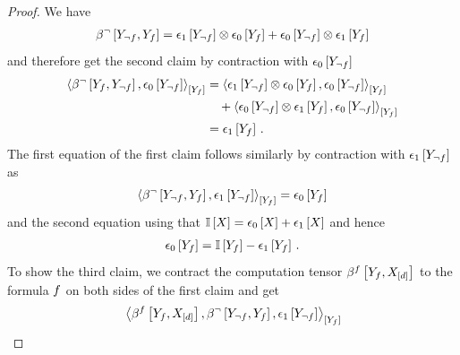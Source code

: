 \begin{proof}
    We have
    \begin{align*}
        \bencodingofat{\lnot}{\headvariableof{\lnot\exformula},\formulavar}
        = \tbasisat{\headvariableof{\lnot\exformula}} \otimes \fbasisat{\formulavar}
        +\fbasisat{\headvariableof{\lnot\exformula}} \otimes \tbasisat{\formulavar}
    \end{align*}
    and therefore get the second claim by contraction with $\epsilon_{0}\left[Y_{\lnot f}\right]$
    \begin{align*}
        \contractionof{
            \bencodingofat{\lnot}{\formulavar,\headvariableof{\lnot\exformula}},\fbasisat{\headvariableof{\lnot\exformula}}
        }{\formulavar}
        &=  \contractionof{
            \tbasisat{\headvariableof{\lnot\exformula}} \otimes \fbasisat{\formulavar},\fbasisat{\headvariableof{\lnot\exformula}}
        }{\formulavar} \\
        &\quad +  \contractionof{
            \fbasisat{\headvariableof{\lnot\exformula}} \otimes \tbasisat{\formulavar},\fbasisat{\headvariableof{\lnot\exformula}}
        }{\formulavar}
        \\
        &= \tbasisat{\formulavar} \, .
    \end{align*}
    The first equation of the first claim follows similarly by contraction with $\epsilon_{1}\left[Y_{\lnot f}\right]$ as
    \begin{align*}
        \contractionof{
            \bencodingofat{\lnot}{\headvariableof{\lnot\exformula},\formulavar},\tbasisat{\headvariableof{\lnot\exformula}}
        }{\formulavar}
        = \fbasisat{\formulavar}
    \end{align*}
    and the second equation using that $\mathbb{I}\left[X\right]=\epsilon_{0}\left[X\right]+\epsilon_{1}\left[X\right]$ and hence
    \begin{align*}
        \epsilon_{0}\left[Y_{f}\right] =  \mathbb{I}\left[Y_{f}\right] - \epsilon_{1}\left[Y_{f}\right] \, .
    \end{align*}
    To show the third claim, we contract the computation tensor $\bencodingofat{\exformula}{\formulavar,\shortcatvariables}$ to the formula $f$ on both sides of the first claim and get
    \begin{align*}
        &\contractionof{
            \bencodingofat{\exformula}{\formulavar,\shortcatvariables},\bencodingofat{\lnot}{\headvariableof{\lnot\exformula},\formulavar},\tbasisat{\headvariableof{\lnot\exformula}}
        }{\formulavar} \\

\end{align*}
\end{proof}
